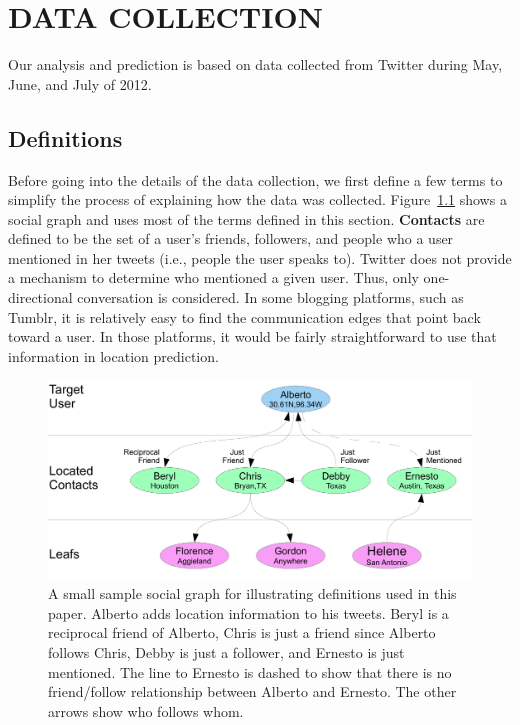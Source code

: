 \chapter{\uppercase {Data Collection}}

Our analysis and prediction is based on data collected from Twitter during May,
June, and July of 2012.

\section{Definitions}
Before going into the details of the data collection, we first define a few
terms to simplify the process of explaining how the data was collected.
%
Figure~\ref{fig:Terms} shows a social graph and uses most of the terms defined
in this section.
%
\textbf{Contacts} are defined to be the set of a user's friends, followers, and
people who a user mentioned in her tweets (i.e., people the user speaks to).
%
Twitter does not provide a mechanism to determine who mentioned a given user.
%
Thus, only one-directional conversation is considered.
%
In some blogging platforms, such as Tumblr, it is relatively easy to find the
communication edges that point back toward a user.
%
In those platforms, it would be fairly straightforward to use that information
in location prediction.

\begin{figure}[tb]
\centering
\includegraphics[width=\linewidth]{figures/terms.pdf}
\caption{
A small sample social graph for illustrating definitions used in this paper.
Alberto adds location information to his tweets.
Beryl is a reciprocal friend of Alberto, Chris is just a friend since Alberto
follows Chris, Debby is just a follower, and Ernesto is just mentioned.
The line to Ernesto is dashed to show that there is no friend/follow
relationship between Alberto and Ernesto.
The other arrows show who follows whom.
}
\label{fig:Terms}
\end{figure}

